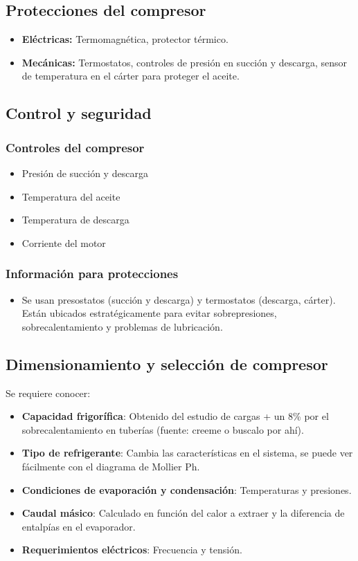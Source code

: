 \subsection{Protecciones del compresor}
\begin{itemize}
\item \textbf{Eléctricas:} Termomagnética, protector térmico.
\item \textbf{Mecánicas:} Termostatos, controles de presión en succión y descarga, sensor de temperatura en el cárter para proteger el aceite.
\end{itemize}

\subsection{Control y seguridad}
\subsubsection{Controles del compresor}
\begin{itemize}
\item Presión de succión y descarga
\item Temperatura del aceite
\item Temperatura de descarga
\item Corriente del motor
\end{itemize}

\subsubsection{Información para protecciones}
\begin{itemize}
\item Se usan presostatos (succión y descarga) y termostatos (descarga, cárter). Están ubicados estratégicamente para evitar sobrepresiones, sobrecalentamiento y problemas de lubricación.
\end{itemize}

\subsection{Dimensionamiento y selección de compresor}
 Se requiere conocer:
\begin{itemize}
    \item \textbf{Capacidad frigorífica}: Obtenido del estudio de cargas + un 8\% por el sobrecalentamiento en tuberías (fuente: creeme o buscalo por ahí).
    \item \textbf{Tipo de refrigerante}: Cambia las características en el sistema, se puede ver fácilmente con el diagrama de Mollier Ph.
    \item \textbf{Condiciones de evaporación y condensación}: Temperaturas y presiones.
    \item \textbf{Caudal másico}: Calculado en función del calor a extraer y la diferencia de entalpías en el evaporador.
    \item \textbf{Requerimientos eléctricos}: Frecuencia y tensión.
\end{itemize}

